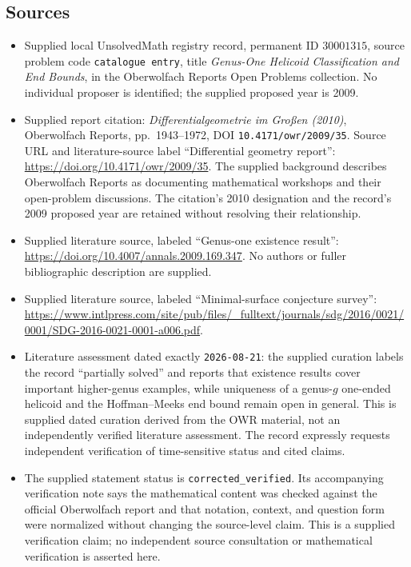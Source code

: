 \documentclass[11pt]{article}
\begin{document}
\subsection{Sources}
\begin{itemize}
\item Supplied local UnsolvedMath registry record, permanent ID \(30001315\), source problem code \texttt{catalogue entry}, title \emph{Genus-One Helicoid Classification and End Bounds}, in the Oberwolfach Reports Open Problems collection. No individual proposer is identified; the supplied proposed year is 2009.
\item Supplied report citation: \emph{Differentialgeometrie im Großen (2010)}, Oberwolfach Reports, pp.~1943--1972, DOI \texttt{10.4171/owr/2009/35}. Source URL and literature-source label ``Differential geometry report'': \url{https://doi.org/10.4171/owr/2009/35}. The supplied background describes Oberwolfach Reports as documenting mathematical workshops and their open-problem discussions. The citation's 2010 designation and the record's 2009 proposed year are retained without resolving their relationship.
\item Supplied literature source, labeled ``Genus-one existence result'': \url{https://doi.org/10.4007/annals.2009.169.347}. No authors or fuller bibliographic description are supplied.
\item Supplied literature source, labeled ``Minimal-surface conjecture survey'': \url{https://www.intlpress.com/site/pub/files/_fulltext/journals/sdg/2016/0021/0001/SDG-2016-0021-0001-a006.pdf}.
\item Literature assessment dated exactly \texttt{2026-08-21}: the supplied curation labels the record ``partially solved'' and reports that existence results cover important higher-genus examples, while uniqueness of a genus-\(g\) one-ended helicoid and the Hoffman--Meeks end bound remain open in general. This is supplied dated curation derived from the OWR material, not an independently verified literature assessment. The record expressly requests independent verification of time-sensitive status and cited claims.
\item The supplied statement status is \texttt{corrected\_verified}. Its accompanying verification note says the mathematical content was checked against the official Oberwolfach report and that notation, context, and question form were normalized without changing the source-level claim. This is a supplied verification claim; no independent source consultation or mathematical verification is asserted here.
\end{itemize}
\end{document}
